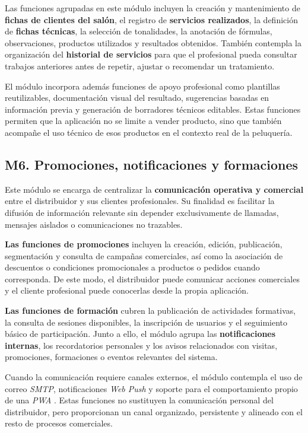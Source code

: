 Las funciones agrupadas en este módulo incluyen la creación y mantenimiento de \textbf{fichas de clientes del salón}, el registro de \textbf{servicios realizados}, la definición de \textbf{fichas técnicas}, la selección de tonalidades, la anotación de fórmulas, observaciones, productos utilizados y resultados obtenidos. También contempla la organización del \textbf{historial de servicios} para que el profesional pueda consultar trabajos anteriores antes de repetir, ajustar o recomendar un tratamiento.

El módulo incorpora además funciones de apoyo profesional como plantillas reutilizables, documentación visual del resultado, sugerencias basadas en información previa y generación de borradores técnicos editables. Estas funciones permiten que la aplicación no se limite a vender producto, sino que también acompañe el uso técnico de esos productos en el contexto real de la peluquería.

\subsection{M6. Promociones, notificaciones y formaciones}

Este módulo se encarga de centralizar la \textbf{comunicación operativa y comercial} entre el distribuidor y sus clientes profesionales. Su finalidad es facilitar la difusión de información relevante sin depender exclusivamente de llamadas, mensajes aislados o comunicaciones no trazables.

\textbf{Las funciones de promociones} incluyen la creación, edición, publicación, segmentación y consulta de campañas comerciales, así como la asociación de descuentos o condiciones promocionales a productos o pedidos cuando corresponda. De este modo, el distribuidor puede comunicar acciones comerciales y el cliente profesional puede conocerlas desde la propia aplicación.

\textbf{Las funciones de formación} cubren la publicación de actividades formativas, la consulta de sesiones disponibles, la inscripción de usuarios y el seguimiento básico de participación. Junto a ello, el módulo agrupa las \textbf{notificaciones internas}, los recordatorios personales y los avisos relacionados con visitas, promociones, formaciones o eventos relevantes del sistema.

Cuando la comunicación requiere canales externos, el módulo contempla el uso de correo \textit{SMTP}, notificaciones \textit{Web Push} y soporte para el comportamiento propio de una \textit{PWA} \citep{nodemailersmtp2026,webpushapi2026,webdev-pwa}. Estas funciones no sustituyen la comunicación personal del distribuidor, pero proporcionan un canal organizado, persistente y alineado con el resto de procesos comerciales.

